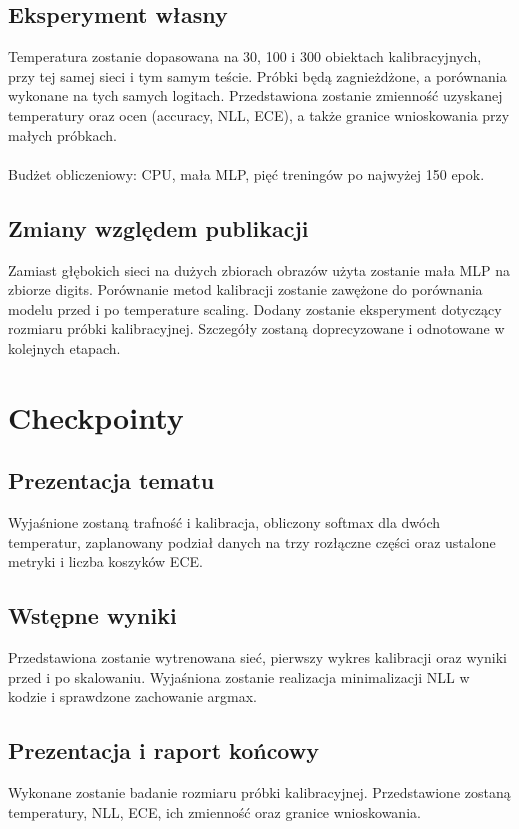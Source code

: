 \documentclass[10pt,a4paper]{article}
\begin{document}
\subsection{Eksperyment własny}
Temperatura zostanie dopasowana na 30, 100 i 300 obiektach kalibracyjnych, przy tej samej sieci i tym samym teście. Próbki będą zagnieżdżone, a porównania wykonane na tych samych logitach. Przedstawiona zostanie zmienność uzyskanej temperatury oraz ocen (accuracy, NLL, ECE), a także granice wnioskowania przy małych próbkach.
\\\\\noindent
Budżet obliczeniowy: CPU, mała MLP, pięć treningów po najwyżej 150 epok.

\subsection{Zmiany względem publikacji}
Zamiast głębokich sieci na dużych zbiorach obrazów użyta zostanie mała MLP na zbiorze digits. Porównanie metod kalibracji zostanie zawężone do porównania modelu przed i po temperature scaling. Dodany zostanie eksperyment dotyczący rozmiaru próbki kalibracyjnej. Szczegóły zostaną doprecyzowane i odnotowane w kolejnych etapach.

\section{Checkpointy}

    
\subsection{Prezentacja tematu}
    Wyjaśnione zostaną trafność i kalibracja, obliczony softmax dla dwóch temperatur, zaplanowany podział danych na trzy rozłączne części oraz ustalone metryki i liczba koszyków ECE.

    
\subsection{Wstępne wyniki}
    Przedstawiona zostanie wytrenowana sieć, pierwszy wykres kalibracji oraz wyniki przed i po skalowaniu. Wyjaśniona zostanie realizacja minimalizacji NLL w kodzie i sprawdzone zachowanie argmax.

    
\subsection{Prezentacja i raport końcowy}
    Wykonane zostanie badanie rozmiaru próbki kalibracyjnej. Przedstawione zostaną temperatury, NLL, ECE, ich zmienność oraz granice wnioskowania.
\end{document}
